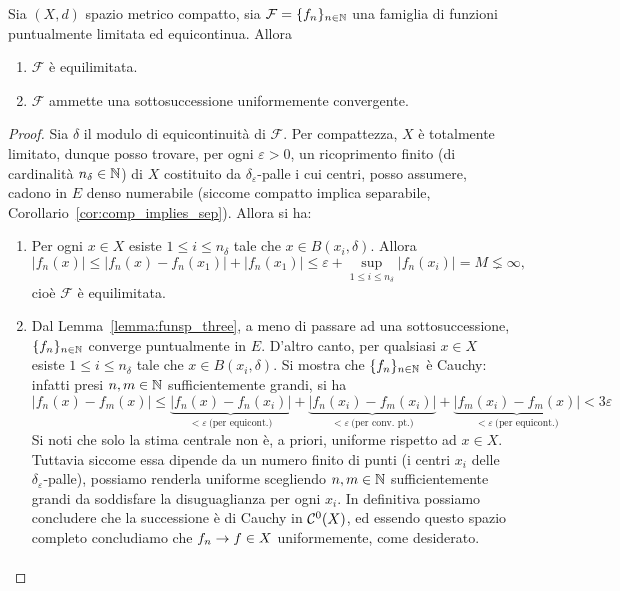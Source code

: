 \begin{theorem}
	Sia $(X,d)$ spazio metrico compatto, sia $\mathcal F =\{f_n\}_{n \in \mathbb{N}}$ una famiglia di funzioni puntualmente limitata ed equicontinua.
	Allora
	\begin{enumerate}
		\item $\mathcal F$ è equilimitata.
		\item $\mathcal F$ ammette una sottosuccessione uniformemente convergente.
	\end{enumerate}
\end{theorem}
\begin{proof}
	Sia $\delta$ il modulo di equicontinuità di $\mathcal F$.
	Per compattezza, $X$ è totalmente limitato, dunque posso trovare, per ogni $\varepsilon > 0$, un ricoprimento finito (di cardinalità $n_\delta \in \mathbb{N}$) di $X$ costituito da $\delta_\varepsilon$-palle i cui centri, posso assumere, cadono in $E$ denso numerabile (siccome compatto implica separabile, Corollario~\ref{cor:comp_implies_sep}).
	Allora si ha:
	\begin{enumerate}
		\item Per ogni $x \in X$ esiste $1 \leq i \leq n_\delta$ tale che $x \in B(x_i, \delta)$. Allora
		\begin{equation*}
			|f_n(x)| \leq |f_n(x) - f_n(x_1)| + |f_n(x_1)| \leq \varepsilon + \sup_{1 \leq i \leq n_\delta} |f_n(x_i)| = M \lneq \infty,
		\end{equation*}
		cioè $\mathcal F$ è equilimitata.

		\item Dal Lemma~\ref{lemma:funsp_three}, a meno di passare ad una sottosuccessione, $\{f_n\}_{n \in \mathbb{N}}$ converge puntualmente in $E$. D'altro canto, per qualsiasi $x \in X$ esiste $1 \leq i \leq n_\delta$ tale che $x \in B(x_i, \delta)$. Si mostra che $\{f_n\}_{n \in \mathbb{N}}$ è Cauchy: infatti presi $n,m \in \mathbb{N}$ sufficientemente grandi, si ha
		\begin{equation*}
			|f_n(x) - f_m(x)| \leq \underbrace{|f_n(x)-f_n(x_i)|}_{< \varepsilon\ \text{(per equicont.)}} + \underbrace{|f_n(x_i) - f_m(x_i)|}_{< \varepsilon\ \text{(per conv. pt.)}} + \underbrace{|f_m(x_i) - f_m(x)|}_{< \varepsilon\ \text{(per equicont.)}} < 3\varepsilon
		\end{equation*}
		Si noti che solo la stima centrale non è, a priori, uniforme rispetto ad $x \in X$.
		Tuttavia siccome essa dipende da un numero finito di punti (i centri $x_i$ delle $\delta_\varepsilon$-palle), possiamo renderla uniforme scegliendo $n,m \in \mathbb{N}$ sufficientemente grandi da soddisfare la disuguaglianza per ogni $x_i$.
		In definitiva possiamo concludere che la successione è di Cauchy in $\mathcal{C}^0(X)$, ed essendo questo spazio completo concludiamo che $f_n \underset{{}}{\rightarrow} f \in X$ uniformemente, come desiderato.
	\end{enumerate}
\end{proof}

